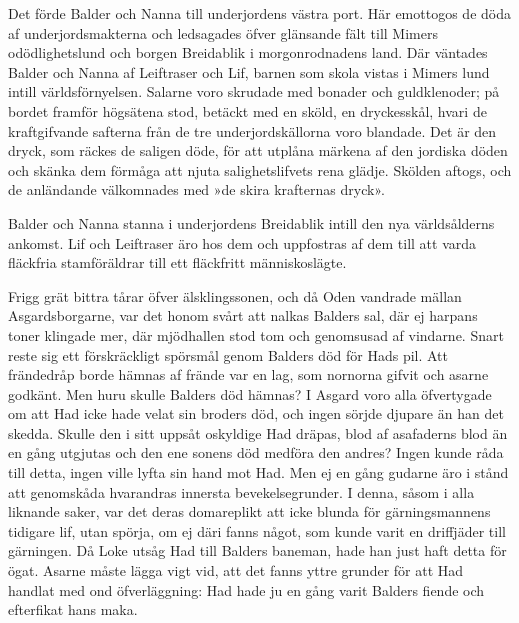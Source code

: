 Det förde Balder och Nanna till underjordens västra port. Här emottogos
de döda af underjordsmakterna och ledsagades öfver glänsande fält till
Mimers odödlighetslund och borgen Breidablik i morgonrodnadens land. Där
väntades Balder och Nanna af Leiftraser och Lif, barnen som skola vistas
i Mimers lund intill världsförnyelsen. Salarne voro skrudade med bonader
och guldklenoder; på bordet framför högsätena stod, betäckt med en
sköld, en dryckesskål, hvari de kraftgifvande safterna från de tre
underjordskällorna voro blandade. Det är den dryck, som räckes de
saligen döde, för att utplåna märkena af den jordiska döden och skänka
dem förmåga att njuta salighetslifvets rena glädje. Skölden aftogs, och
de anländande välkomnades med »de skira krafternas dryck».

Balder och Nanna stanna i underjordens Breidablik intill den nya
världsålderns ankomst. Lif och Leiftraser äro hos dem och uppfostras af
dem till att varda fläckfria stamföräldrar till ett fläckfritt
människoslägte.

Frigg grät bittra tårar öfver älsklingssonen, och då Oden vandrade
mällan Asgardsborgarne, var det honom svårt att nalkas Balders sal, där
ej harpans toner klingade mer, där mjödhallen stod tom och genomsusad af
vindarne. Snart reste sig ett förskräckligt spörsmål genom Balders död
för Hads pil. Att frändedråp borde hämnas af frände var en lag, som
nornorna gifvit och asarne godkänt. Men huru skulle Balders död hämnas?
I Asgard voro alla öfvertygade om att Had icke hade velat sin broders
död, och ingen sörjde djupare än han det skedda. Skulle den i sitt
uppsåt oskyldige Had dräpas, blod af asafaderns blod än en gång utgjutas
och den ene sonens död medföra den andres? Ingen kunde råda till
detta, ingen ville lyfta sin hand mot Had. Men ej en gång gudarne äro i
stånd att genomskåda hvarandras innersta bevekelsegrunder. I denna,
såsom i alla liknande saker, var det deras domareplikt att icke blunda
för gärningsmannens tidigare lif, utan spörja, om ej däri fanns något,
som kunde varit en driffjäder till gärningen. Då Loke utsåg Had till
Balders baneman, hade han just haft detta för ögat. Asarne måste lägga
vigt vid, att det fanns yttre grunder för att Had handlat med ond
öfverläggning: Had hade ju en gång varit Balders fiende och efterfikat
hans maka.


